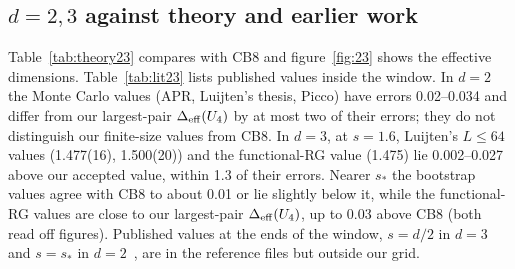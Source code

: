 \documentclass[10pt,a4paper]{article}
\newcommand{\Deff}{\Delta_{\rm eff}}
\begin{document}
\subsection{\texorpdfstring{$d=2,3$ against theory and earlier work}{d=2,3 against theory and earlier work}}
Table~\ref{tab:theory23} compares with CB8 and figure~\ref{fig:23} shows the effective dimensions. Table~\ref{tab:lit23} lists published values
inside the window. In $d=2$ the Monte Carlo values (APR, Luijten's thesis, Picco) have errors 0.02--0.034 and differ from our largest-pair
$\Deff(U_4)$ by at most two of their errors; they do not distinguish our finite-size values from CB8. In $d=3$, at $s=1.6$, Luijten's
$L\le64$ values (1.477(16), 1.500(20)) and the functional-RG value (1.475) lie 0.002--0.027 above our accepted value, within 1.3 of their
errors. Nearer $s_*$ the bootstrap values agree with CB8 to about 0.01 or lie slightly below it, while the functional-RG values are close to
our largest-pair $\Deff(U_4)$, up to 0.03 above CB8 (both read off figures). Published values at the ends of the window, $s=d/2$ in
$d=3$~\cite{Luijten:1997cl} and $s=s_*$ in $d=2$~\cite{Xiao:2025sk}, are in the reference files but outside our grid.
\end{document}
